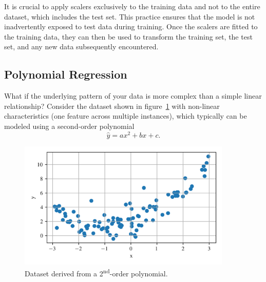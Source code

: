 \documentclass[12pt,letter]{article}
\begin{document}
\begin{mdframed}[middlelinewidth=0.5mm]
\begin{center}
\end{center}
It is crucial to apply scalers exclusively to the training data and not to the entire dataset, which includes the test set. This practice ensures that the model is not inadvertently exposed to test data during training. Once the scalers are fitted to the training data, they can then be used to transform the training set, the test set, and any new data subsequently encountered.
\end{mdframed}


\pagebreak





\subsection{Polynomial Regression }





What if the underlying pattern of your data is more complex than a simple linear relationship? Consider the dataset shown in figure~\ref{fig:Polynomial_1} with non-linear characteristics (one feature across multiple instances), which typically can be modeled using a second-order polynomial
\begin{equation}
\hat{y}=ax^2+bx+c.
\label{eq:poly}
\end{equation}


\begin{figure}[H]
	\centering
	\includegraphics[width=4in]{../figures/polynomial_regression_1}
	\caption{Dataset derived from a 2\textsuperscript{nd}-order polynomial.}
	\label{fig:Polynomial_1}
\end{figure}
\end{document}
